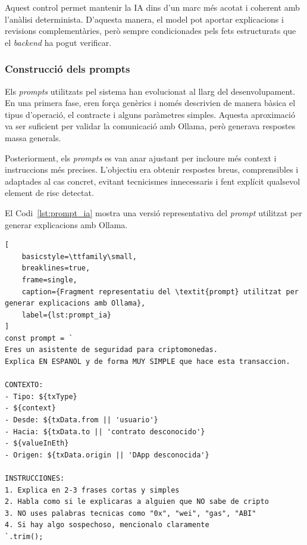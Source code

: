 Aquest control permet mantenir la IA dins d’un marc més acotat i coherent amb l’anàlisi determinista. D’aquesta manera, el model pot aportar explicacions i revisions complementàries, però sempre condicionades pels fets estructurats que el \textit{backend} ha pogut verificar.

\subsubsection{Construcció dels prompts}

Els \textit{prompts} utilitzats pel sistema han evolucionat al llarg del desenvolupament. En una primera fase, eren força genèrics i només descrivien de manera bàsica el tipus d’operació, el contracte i alguns paràmetres simples. Aquesta aproximació va ser suficient per validar la comunicació amb Ollama, però generava respostes massa generals.

Posteriorment, els \textit{prompts} es van anar ajustant per incloure més context i instruccions més precises. L’objectiu era obtenir respostes breus, comprensibles i adaptades al cas concret, evitant tecnicismes innecessaris i fent explícit qualsevol element de risc detectat.

\newpage
El Codi~\ref{lst:prompt_ia} mostra una versió representativa del \textit{prompt} utilitzat per generar explicacions amb Ollama.

\begin{lstlisting}[
    basicstyle=\ttfamily\small,
    breaklines=true,
    frame=single,
    caption={Fragment representatiu del \textit{prompt} utilitzat per generar explicacions amb Ollama},
    label={lst:prompt_ia}
]
const prompt = `
Eres un asistente de seguridad para criptomonedas.
Explica EN ESPANOL y de forma MUY SIMPLE que hace esta transaccion.

CONTEXTO:
- Tipo: ${txType}
- ${context}
- Desde: ${txData.from || 'usuario'}
- Hacia: ${txData.to || 'contrato desconocido'}
- ${valueInEth}
- Origen: ${txData.origin || 'DApp desconocida'}

INSTRUCCIONES:
1. Explica en 2-3 frases cortas y simples
2. Habla como si le explicaras a alguien que NO sabe de cripto
3. NO uses palabras tecnicas como "0x", "wei", "gas", "ABI"
4. Si hay algo sospechoso, mencionalo claramente
`.trim();
\end{lstlisting}
